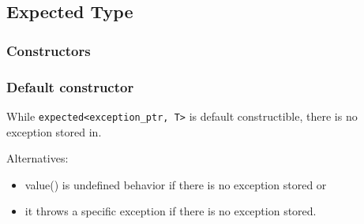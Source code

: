 \documentclass[xcolor=dvipsnames]{beamer}
\newcommand{\cpp}[1]{\lstinline{#1}}
\begin{document}
\subsection{Expected Type}
\subsubsection{Constructors}
\begin{frame}[fragile]
\frametitle{Default constructor}
While \cpp{expected<exception_ptr, T>} is default constructible, there is no exception stored in.

Alternatives: 

\begin{itemize}
\item value() is undefined behavior if there is no exception stored or 
\item it throws a specific exception if there is no exception stored.
\end{itemize}

\end{frame}
\end{document}
